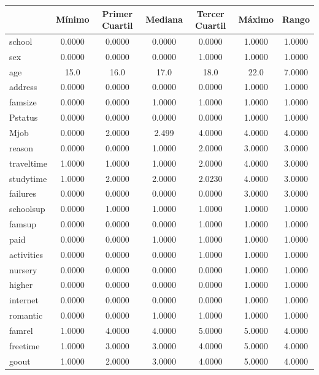 \documentclass[a4paper, 11pt]{article}
\begin{document}
\begin{center}
\begin{tabular}{lcccccc}
\toprule
& Mínimo & Primer Cuartil & Mediana & Tercer Cuartil & Máximo & Rango \\ 
\midrule
school       & 0.0000 & 0.0000 & 0.0000 & 0.0000 & 1.0000 & 1.0000 \\ 
sex          & 0.0000 & 0.0000 & 0.0000 & 1.0000 & 1.0000 & 1.0000 \\ 
age          & 15.0   & 16.0   & 17.0   & 18.0   & 22.0   & 7.0000 \\ 
address      & 0.0000 & 0.0000 & 0.0000 & 0.0000 & 1.0000 & 1.0000 \\ 
famsize      & 0.0000 & 0.0000 & 1.0000 & 1.0000 & 1.0000 & 1.0000 \\ 
Pstatus      & 0.0000 & 0.0000 & 0.0000 & 0.0000 & 1.0000 & 1.0000 \\ 
Mjob         & 0.0000 & 2.0000 & 2.499  & 4.0000 & 4.0000 & 4.0000 \\ 
reason       & 0.0000 & 0.0000 & 1.0000 & 2.0000 & 3.0000 & 3.0000 \\ 
traveltime   & 1.0000 & 1.0000 & 1.0000 & 2.0000 & 4.0000 & 3.0000 \\ 
studytime    & 1.0000 & 2.0000 & 2.0000 & 2.0230 & 4.0000 & 3.0000 \\ 
failures     & 0.0000 & 0.0000 & 0.0000 & 0.0000 & 3.0000 & 3.0000 \\ 
schoolsup    & 0.0000 & 1.0000 & 1.0000 & 1.0000 & 1.0000 & 1.0000 \\ 
famsup       & 0.0000 & 0.0000 & 0.0000 & 1.0000 & 1.0000 & 1.0000 \\ 
paid         & 0.0000 & 0.0000 & 1.0000 & 1.0000 & 1.0000 & 1.0000 \\ 
activities   & 0.0000 & 0.0000 & 0.0000 & 1.0000 & 1.0000 & 1.0000 \\ 
nursery      & 0.0000 & 0.0000 & 0.0000 & 0.0000 & 1.0000 & 1.0000 \\ 
higher       & 0.0000 & 0.0000 & 0.0000 & 0.0000 & 1.0000 & 1.0000 \\ 
internet     & 0.0000 & 0.0000 & 0.0000 & 0.0000 & 1.0000 & 1.0000 \\ 
romantic     & 0.0000 & 0.0000 & 1.0000 & 1.0000 & 1.0000 & 1.0000 \\ 
famrel       & 1.0000 & 4.0000 & 4.0000 & 5.0000 & 5.0000 & 4.0000 \\ 
freetime     & 1.0000 & 3.0000 & 3.0000 & 4.0000 & 5.0000 & 4.0000 \\ 
goout        & 1.0000 & 2.0000 & 3.0000 & 4.0000 & 5.0000 & 4.0000 \\ 

\end{tabular}
\end{center}
\end{document}
